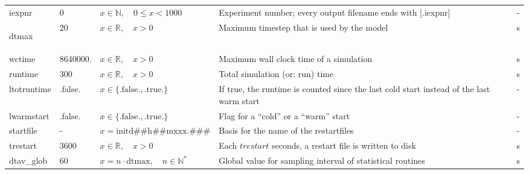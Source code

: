 \documentclass[twoside,11pt,fleqn,a4paper,english,openright]{report}
\begin{document}
\begin{center}
  \tablelasttail{
        &&&&\\\hline
  }
\begin{supertabular}{|l|p{1.6cm}|p{4.4cm}|p{6cm}|l|}
  iexpnr	& 0		& $x \in \mathbb{N}, \quad 0 \leq  x < 1000$		& Experiment number; every output filename ends with [.iexpnr]	& -\\
  \hypertarget{dtmax}{dtmax}	& 20		& $x \in \mathbb{R}, \quad x>0$		& Maximum timestep that is used by the model	& s\\
  wctime	& 8640000.	& $x \in \mathbb{R}, \quad x>0$		&  Maximum wall clock time of a simulation & s\\
  runtime	& 300		& $x \in \mathbb{R}, \quad x>0$		& Total simulation (or: run) time		& s\\
  ltotruntime	& .false.		& $x\in\{\text{.false.},\text{.true.}\}$		& If true, the runtime is counted since the last cold start instead of the last warm start	& -\\
  lwarmstart& .false.	& $x\in\{\text{.false.},\text{.true.}\}$		& Flag for a ``cold'' or a  ``warm'' start	& -\\
  startfile	& -		& $x = \text{initd\#\#h\#\#mxxx.\#\#\#}$	& Basis for the name of the restartfiles	& -\\
  trestart	& 3600		& $x \in \mathbb{R}, \quad x>0$		& Each $trestart$ seconds, a restart file is written to disk	& s\\
  dtav\_glob	& 60		& $x = n \cdot \text{dtmax}, \quad n \in \mathbb{N}^*$		& Global value for sampling interval of statistical routines	& s\\

\end{supertabular}
\end{center}
\end{document}
